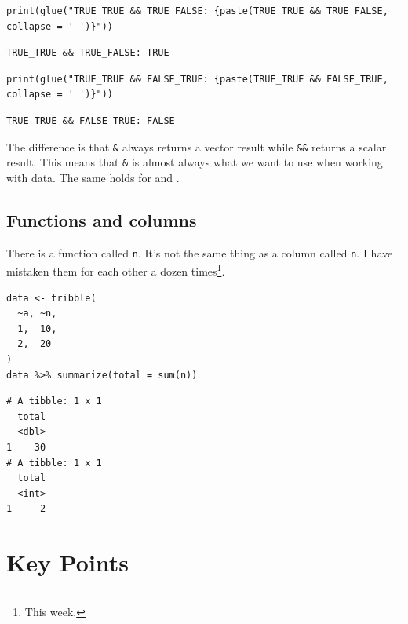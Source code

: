 \begin{lstlisting}
print(glue("TRUE_TRUE && TRUE_FALSE: {paste(TRUE_TRUE && TRUE_FALSE, collapse = ' ')}"))
\end{lstlisting}

\begin{lstlisting}
TRUE_TRUE && TRUE_FALSE: TRUE
\end{lstlisting}

\begin{lstlisting}
print(glue("TRUE_TRUE && FALSE_TRUE: {paste(TRUE_TRUE && FALSE_TRUE, collapse = ' ')}"))
\end{lstlisting}

\begin{lstlisting}
TRUE_TRUE && FALSE_TRUE: FALSE
\end{lstlisting}

The difference is that \texttt{\&} always returns a vector result
while \texttt{\&\&} returns a scalar result.
This means that \texttt{\&} is almost always what we want to use when working with data.
The same holds for \texttt{{\textbar}} and \texttt{{\textbar}{\textbar}}.

\subsection*{Functions and columns}

There is a function called \texttt{n}.
It's not the same thing as a column called \texttt{n}.
I have mistaken them for each other a dozen times\footnote{This week.}.

\begin{lstlisting}
data <- tribble(
  ~a, ~n,
  1,  10,
  2,  20
)
data %>% summarize(total = sum(n))
\end{lstlisting}

\begin{lstlisting}
# A tibble: 1 x 1
  total
  <dbl>
1    30
# A tibble: 1 x 1
  total
  <int>
1     2
\end{lstlisting}

\section{Key Points}

